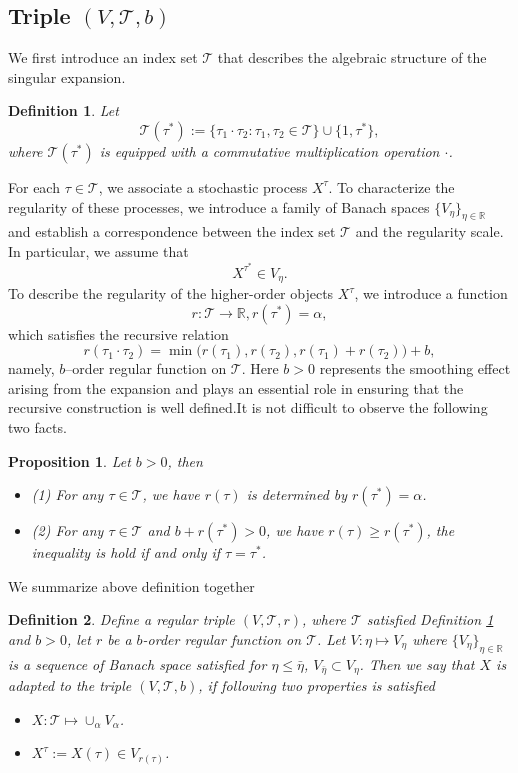 \documentclass{article}
\newtheorem{definition}{Definition}[section]
\newtheorem{proposition}{Proposition}[section]
\numberwithin{equation}{section}
\newcommand{\m}{\mathbb}
\newcommand{\ml}{\mathcal}
\begin{document}
\subsection{Triple $(V,\ml T,b)$}
We first introduce an index set $\ml T$ that describes the algebraic structure of the singular expansion.
\begin{definition}\label{def;regular sequence}
Let
\[
\ml T(\tau^*):=
\{\tau_1\cdot\tau_2:\tau_1,\tau_2\in\ml T\}
\cup\{1,\tau^*\},
\]
where $\ml T(\tau^*)$ is equipped with a commutative multiplication operation $\cdot$.

\end{definition}

For each $\tau\in\ml T$, we associate a stochastic process $X^\tau$. To characterize the regularity of these processes, we introduce a family of Banach spaces
$\{V_\eta\}_{\eta\in\mathbb R}$ and establish a correspondence between the index set $\ml T$ and the regularity scale. In particular, we assume that
\[
X^{\tau^*}\in V_\eta .
\]
To describe the regularity of the higher-order objects $X^\tau$, we introduce a function
\[
r:\ml T\rightarrow\mathbb R, r(\tau^*)=\alpha,
\]
which satisfies the recursive relation
\begin{equation}\label{eq;r}
    r(\tau_1\cdot\tau_2)
=
\min
\big(
r(\tau_1),
r(\tau_2),
r(\tau_1)+r(\tau_2)
\big)+b,
\end{equation}
namely, $b$--order regular function on $\ml T$. Here $b>0$ represents the smoothing effect arising from the expansion and plays an essential role in ensuring that the recursive construction is well defined.It is not difficult to observe the following two facts.
\begin{proposition}\label{prop;tau}
Let $b>0$, then 
    \begin{itemize}
        \item (1) For any $\tau\in\ml T$, we have $r(\tau)$ is determined by $r(\tau^*)=\alpha$. 
        \item (2) For any $\tau\in\ml T$ and $b+r(\tau^*)>0$, we have $r(\tau)\geq r(\tau^*)$, the inequality is hold if and only if $\tau=\tau^*$.
    \end{itemize}
\end{proposition}
We summarize above definition together
\begin{definition}
	Define a regular triple $(V,\ml T,r)$, where $\ml T$ satisfied Definition \ref{def;regular sequence} and $b>0$, let $r$ be a $b$-order regular function on $\ml T$. Let $V:\eta\mapsto V_\eta$ where $\{V_\eta\}_{\eta\in\m R}$ is a sequence of Banach space satisfied for $\eta\leq \bar\eta$, $V_{\bar\eta}\subset V_\eta$. Then we say that $X$ is adapted to the triple $(V,\ml T,b)$, if following two properties is satisfied 
	 \begin{itemize}
		\item[(1)]{$X:\ml T\mapsto \cup_{\alpha}V_\alpha$.}
		\item[(2)]{$X^\tau:=X(\tau)\in V_{r(\tau)}$.}
	\end{itemize}
\end{definition}
\end{document}
